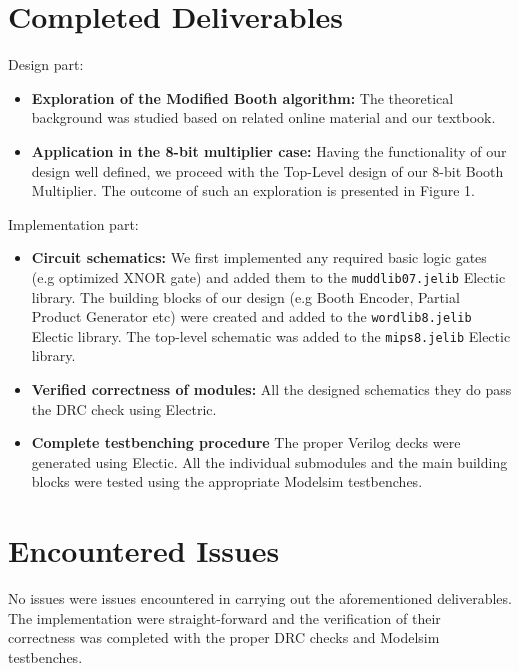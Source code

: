 \documentclass[conference]{IEEEtran}
\begin{document}
\section{Completed Deliverables\cite{gitDel}}
Design part:
\begin{itemize}
\item \textbf{Exploration of the Modified Booth algorithm:}
The theoretical background was studied based on 
related online material and our textbook\cite{tb}.

\item \textbf{Application in the 8-bit multiplier case:}
Having the functionality of our design 
well defined, we proceed with the Top-Level design 
of our 8-bit Booth Multiplier.
The outcome of such an exploration is presented
in Figure 1.

\end{itemize}

Implementation part:
\begin{itemize}
\item \textbf{Circuit schematics:}
We first implemented 
any required basic logic gates (e.g optimized 
XNOR gate) and added them to the
\texttt{muddlib07.jelib} Electic library.
The building blocks of our design
(e.g Booth Encoder, Partial Product Generator etc)
were created and added to the
\texttt{wordlib8.jelib} Electic library.
The top-level schematic was added to 
the \texttt{mips8.jelib} Electic library.


\item \textbf{Verified correctness of modules:}
All the designed schematics they do pass the 
DRC check using Electric.

\item \textbf{Complete testbenching procedure}
The proper Verilog decks were generated using
Electic. All the individual submodules and the
main building blocks were tested using the 
appropriate Modelsim testbenches.

\end{itemize}




\section{Encountered Issues}

No issues were issues encountered
in carrying out	the aforementioned 
deliverables. The implementation were
straight-forward and the verification
of their correctness was completed with
the proper DRC checks and Modelsim 
testbenches.
\end{document}
